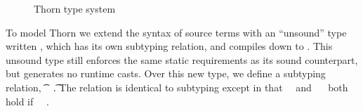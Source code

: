 \documentclass[acmlarge, anonymous, authordraft]{acmart}
\begin{document}
\begin{figure}
\hrulefill
\begin{mathpar}










\end{mathpar}
\hrulefill
\caption{Thorn type system}\label{f:thornts}
\end{figure}

To model Thorn we extend the syntax of source terms with an ``unsound'' type
written \dt\C, which has its own subtyping relation, and compiles down to
\any. This unsound type still enforces the same static requirements as its
sound counterpart, but generates no runtime casts.  Over this new type, we
define a subtyping relation, \t~\src\Sub~\t. The relation is identical to
\kafka subtyping except in that \dt\C~\src\Sub~\dt\D and \C~\src\Sub~\dt\D
both hold if \C~\src\Sub~\D.  
\end{document}
